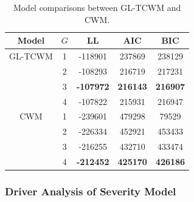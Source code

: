 \documentclass[11pt,letterpaper]{article}
\numberwithin{equation}{section}
\numberwithin{equation}{section}
\numberwithin{equation}{section}
\begin{document}
\begin{table}[!htb]
\begin{center}
     	\caption{Model comparisons between GL-TCWM and CWM.}
        \begin{tabular}{ccccc}
        		\hline\hline	
				Model & $G$ & LL & AIC    & BIC    \\
				\hline
			GL-TCWM & 1& -118901 & 237869 & 238129  \\
						& 2& -108293  & 216719 & 217231 \\
						&3  &  \textbf{-107972 } & \textbf{216143} & \textbf{216907}\\
						& 4 & -107822  & 215931 &  216947 \\
				CWM &  1  & -239601 &  479298  & 79529 \\
				& 2 & -226334 & 452921 & 453433  \\
				& 3 & -216255  & 432710 & 433474  \\
				& 4 & \textbf{-212452}   &\textbf{425170}&\textbf{426186}\\
				\hline\hline
\end{tabular}
\end{center}
\end{table}

\subsubsection{Driver Analysis of Severity Model}
\end{document}
